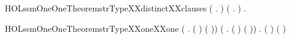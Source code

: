 \newcommand{\HOLssmOneOneTheoremsTRruleOne}{\UseVerbatim{HOLssmOneOneTheoremsTRruleOne}}
\begin{SaveVerbatim}{HOLssmOneOneTheoremstrTypeXXdistinctXXclauses}
\HOLTokenTurnstile{} (\HOLSymConst{\HOLTokenForall{}} .   \HOLSymConst{\HOLTokenNotEqual{}}  ) \HOLSymConst{\HOLTokenConj{}} (\HOLSymConst{\HOLTokenForall{}} .   \HOLSymConst{\HOLTokenNotEqual{}}  ) \HOLSymConst{\HOLTokenConj{}}
   \HOLSymConst{\HOLTokenForall{}} .   \HOLSymConst{\HOLTokenNotEqual{}}  
\end{SaveVerbatim}
\newcommand{\HOLssmOneOneTheoremstrTypeXXdistinctXXclauses}{\UseVerbatim{HOLssmOneOneTheoremstrTypeXXdistinctXXclauses}}
\begin{SaveVerbatim}{HOLssmOneOneTheoremstrTypeXXoneXXone}
\HOLTokenTurnstile{} (\HOLSymConst{\HOLTokenForall{}} . (  \HOLSymConst{=}  ) \HOLSymConst{\HOLTokenEquiv{}} ( \HOLSymConst{=} )) \HOLSymConst{\HOLTokenConj{}}
   (\HOLSymConst{\HOLTokenForall{}} . (  \HOLSymConst{=}  ) \HOLSymConst{\HOLTokenEquiv{}} ( \HOLSymConst{=} )) \HOLSymConst{\HOLTokenConj{}}
   \HOLSymConst{\HOLTokenForall{}} . (  \HOLSymConst{=}  ) \HOLSymConst{\HOLTokenEquiv{}} ( \HOLSymConst{=} )
\end{SaveVerbatim}
\newcommand{\HOLssmOneOneTheoremstrTypeXXoneXXone}{\UseVerbatim{HOLssmOneOneTheoremstrTypeXXoneXXone}}
